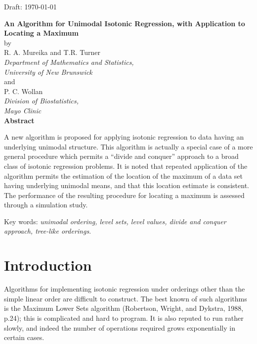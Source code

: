 \setlength{\parindent}{0cm}
\setlength{\parskip}{0.2cm}
\textwidth 6in
\textheight 8.5in
\topmargin -0.375in
\oddsidemargin 0.375in
\newcommand{\fol}{\mbox{$\prec \prec$}}
\newcommand{\iuc}{\mbox{${\cal I}^c$}}
\newcommand{\ilc}{\mbox{${\cal I}_c$}}


\mbox{} \hfill {\sf Draft: \today}\\[0.2cm]
\begin{centre}
{\Large \bf An Algorithm for Unimodal Isotonic Regression, with
Application to Locating a Maximum}\\[0.2cm]
by\\[0.2cm]
R. A. Mureika and T.R. Turner\\[0.2cm]
{\em Department of Mathematics and Statistics,\\[0.2cm]
University of New Brunswick}\\[0.2cm]
and\\[0.2cm]
P. C. Wollan\\[0.2cm]
{\em Division of Biostatistics,\\[0.2cm]
Mayo Clinic}\\[0.5cm]

{\bf Abstract}\\
\end{centre}

A new algorithm is proposed for applying isotonic regression to data
having an underlying unimodal structure.  This algorithm is actually
a special case of a more general procedure which permits a ``divide
and conquer'' approach to a broad class of isotonic regression
problems.  It is noted that repeated application of the algorithm
permits the estimation of the location of the maximum of a data set
having underlying unimodal means, and that this location estimate is
consistent.  The performance of the resulting procedure for locating
a maximum is assessed through a simulation study.

{\small Key words: {\em unimodal ordering, level sets,
level values, divide and conquer approach, tree-like
orderings}.}\\[0.2cm]

\section{Introduction}
\label{intro}
Algorithms for implementing isotonic regression under orderings other
than the simple linear order are difficult to construct.
The best known of such algorithms is the Maximum Lower Sets algorithm
(Robertson, Wright, and Dykstra, 1988, p.24);
this is complicated and hard to program.  It is
also reputed to run rather slowly, and indeed the number of operations
required grows exponentially in certain cases.

